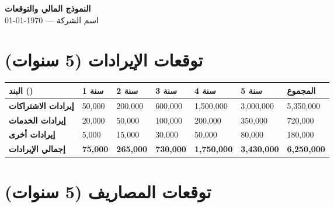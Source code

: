 \documentclass[11pt,a4paper,landscape]{article}
\begin{document}
\begin{center}
{\LARGE\bfseries النموذج المالي والتوقعات}\\[0.3em]
{\large اسم الشركة — \today}\\[1em]
\end{center}

\section{توقعات الإيرادات (5 سنوات)}
\label{sec:revenue}

\begin{table}[H]
\centering
\footnotesize
\renewcommand{\arraystretch}{1.4}
\begin{tabularx}{\textwidth}{L{5cm} R{2.5cm} R{2.5cm} R{2.5cm} R{2.5cm} R{2.5cm} R{2.5cm}}
\toprule
\textbf{البند ()} & \textbf{سنة 1} & \textbf{سنة 2} & \textbf{سنة 3} & \textbf{سنة 4} & \textbf{سنة 5} & \textbf{المجموع} \\
\midrule
{}
\textbf{إيرادات الاشتراكات} & 50,000 & 200,000 & 600,000 & 1,500,000 & 3,000,000 & 5,350,000 \\
\textbf{إيرادات الخدمات} & 20,000 & 50,000 & 100,000 & 200,000 & 350,000 & 720,000 \\
\textbf{إيرادات أخرى} & 5,000 & 15,000 & 30,000 & 50,000 & 80,000 & 180,000 \\
\midrule
\textbf{إجمالي الإيرادات} & \textbf{75,000} & \textbf{265,000} & \textbf{730,000} & \textbf{1,750,000} & \textbf{3,430,000} & \textbf{6,250,000} \\
\bottomrule
\end{tabularx}
\end{table}

\section{توقعات المصاريف (5 سنوات)}
\label{sec:expenses}
\end{document}
